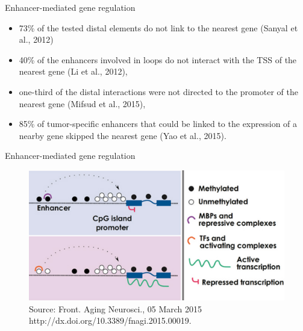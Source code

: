 \documentclass[slidestop,compress,11pt,xcolor=dvipsnames]{beamer}
\begin{document}
\begin{frame}{Enhancer-mediated gene regulation}
 \begin{itemize}
  \item 73\% of the tested distal elements do not link to the nearest gene (Sanyal et al., 2012)
  \item 40\% of the enhancers involved in loops do not interact with the TSS of the nearest gene (Li et al., 2012),
  \item one-third of the distal interactions were not directed to the promoter of the nearest gene (Mifsud et al., 2015),
  \item 85\% of tumor-specific enhancers that could be linked to the expression of a nearby gene skipped the nearest gene (Yao et al., 2015).
 \end{itemize}
\end{frame}

\begin{frame}{ Enhancer-mediated gene regulation}
 \vspace*{-0.1cm}
 \begin{figure}
  \centering
  \includegraphics[width=1.0\linewidth]{dna_met.png}{\tiny{\\Source: Front. Aging Neurosci., 05 March 2015 http://dx.doi.org/10.3389/fnagi.2015.00019.}}
 \end{figure}
\end{frame}
\end{document}
